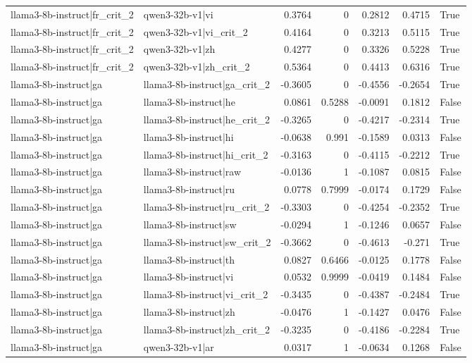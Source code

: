 \begin{table}
\begin{tabular}{l l r r r r l}
llama3-8b-instruct|fr_crit_2 & qwen3-32b-v1|vi & 0.3764 & 0 & 0.2812 & 0.4715 & True \\
llama3-8b-instruct|fr_crit_2 & qwen3-32b-v1|vi_crit_2 & 0.4164 & 0 & 0.3213 & 0.5115 & True \\
llama3-8b-instruct|fr_crit_2 & qwen3-32b-v1|zh & 0.4277 & 0 & 0.3326 & 0.5228 & True \\
llama3-8b-instruct|fr_crit_2 & qwen3-32b-v1|zh_crit_2 & 0.5364 & 0 & 0.4413 & 0.6316 & True \\
llama3-8b-instruct|ga & llama3-8b-instruct|ga_crit_2 & -0.3605 & 0 & -0.4556 & -0.2654 & True \\
llama3-8b-instruct|ga & llama3-8b-instruct|he & 0.0861 & 0.5288 & -0.0091 & 0.1812 & False \\
llama3-8b-instruct|ga & llama3-8b-instruct|he_crit_2 & -0.3265 & 0 & -0.4217 & -0.2314 & True \\
llama3-8b-instruct|ga & llama3-8b-instruct|hi & -0.0638 & 0.991 & -0.1589 & 0.0313 & False \\
llama3-8b-instruct|ga & llama3-8b-instruct|hi_crit_2 & -0.3163 & 0 & -0.4115 & -0.2212 & True \\
llama3-8b-instruct|ga & llama3-8b-instruct|raw & -0.0136 & 1 & -0.1087 & 0.0815 & False \\
llama3-8b-instruct|ga & llama3-8b-instruct|ru & 0.0778 & 0.7999 & -0.0174 & 0.1729 & False \\
llama3-8b-instruct|ga & llama3-8b-instruct|ru_crit_2 & -0.3303 & 0 & -0.4254 & -0.2352 & True \\
llama3-8b-instruct|ga & llama3-8b-instruct|sw & -0.0294 & 1 & -0.1246 & 0.0657 & False \\
llama3-8b-instruct|ga & llama3-8b-instruct|sw_crit_2 & -0.3662 & 0 & -0.4613 & -0.271 & True \\
llama3-8b-instruct|ga & llama3-8b-instruct|th & 0.0827 & 0.6466 & -0.0125 & 0.1778 & False \\
llama3-8b-instruct|ga & llama3-8b-instruct|vi & 0.0532 & 0.9999 & -0.0419 & 0.1484 & False \\
llama3-8b-instruct|ga & llama3-8b-instruct|vi_crit_2 & -0.3435 & 0 & -0.4387 & -0.2484 & True \\
llama3-8b-instruct|ga & llama3-8b-instruct|zh & -0.0476 & 1 & -0.1427 & 0.0476 & False \\
llama3-8b-instruct|ga & llama3-8b-instruct|zh_crit_2 & -0.3235 & 0 & -0.4186 & -0.2284 & True \\
llama3-8b-instruct|ga & qwen3-32b-v1|ar & 0.0317 & 1 & -0.0634 & 0.1268 & False \\

\end{tabular}
\end{table}
